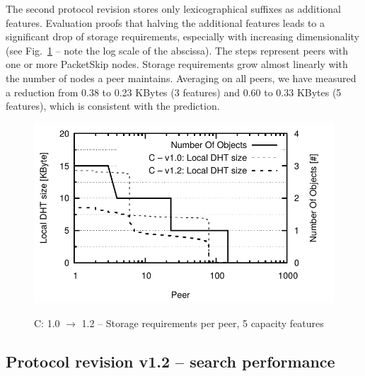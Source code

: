 The second protocol revision stores only lexicographical suffixes as additional features. Evaluation proofs that halving the additional features leads to a significant drop of storage requirements, especially with increasing dimensionality (see Fig.~\ref{fig:dht} -- note the log scale of the abscissa). The steps represent peers with one or more PacketSkip nodes. Storage requirements grow almost linearly with the number of nodes a peer maintains. Averaging on all peers, we have measured a reduction from 0.38 to 0.23 KBytes (3 features) and 0.60 to 0.33 KBytes (5 features), which is consistent with the prediction.

  \begin{figure}[htbp]
    \centering
    \includegraphics[width=0.98\linewidth]{graphics/fig/DHTSize_PeersSort_C}
    \\[-1ex]
    \caption{C: 1.0 $\rightarrow$ 1.2 -- Storage requirements per peer, 5 capacity features}
    \label{fig:dht}
  \end{figure}



\subsection{Protocol revision v1.2 -- search performance}
\label{subsec:search}


